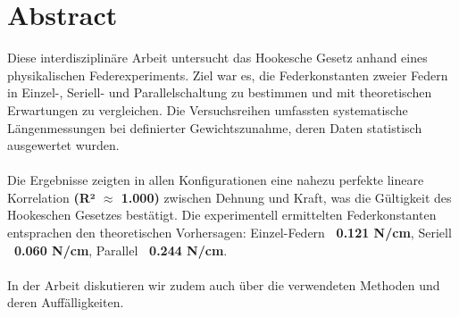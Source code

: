 \documentclass[../main.tex]{subfiles} %
\begin{document}
    \section{Abstract}\label{sec:abstract}
        Diese interdisziplinäre Arbeit untersucht das Hookesche Gesetz anhand eines physikalischen Federexperiments.
        Ziel war es, die Federkonstanten zweier Federn in Einzel-, Seriell- und Parallelschaltung zu bestimmen und mit theoretischen Erwartungen zu vergleichen.
        Die Versuchsreihen umfassten systematische Längenmessungen bei definierter Gewichtszunahme, deren Daten statistisch ausgewertet wurden.
        \\
        \\
        Die Ergebnisse zeigten in allen Konfigurationen eine nahezu perfekte lineare Korrelation \textbf{(R² $\approx$ 1.000)} zwischen Dehnung und Kraft, was die Gültigkeit des Hookeschen Gesetzes bestätigt.
        Die experimentell ermittelten Federkonstanten entsprachen den theoretischen Vorhersagen: Einzel-Federn \textbf{~0.121 N/cm}, Seriell \textbf{~0.060 N/cm}, Parallel \textbf{~0.244 N/cm}.
        \\
        \\
        In der Arbeit diskutieren wir zudem auch über die verwendeten Methoden und deren Auffälligkeiten.
\end{document}
